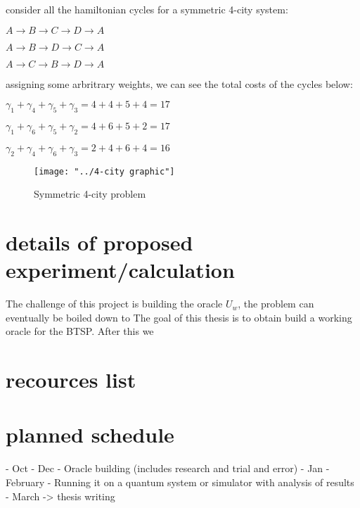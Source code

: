 \documentclass[twocolumn,showpacs,preprintnumbers,amsmath,amssymb]{revtex4}
\begin{document}
		consider all the hamiltonian cycles for a symmetric 4-city system:
		
		
		$ A \rightarrow B \rightarrow C \rightarrow D \rightarrow A $
		
		$ A \rightarrow B \rightarrow D \rightarrow C \rightarrow A $ 
		
		$ A \rightarrow C \rightarrow B \rightarrow D \rightarrow A $
		
		assigning some arbritrary weights, we can see the total costs of the cycles below:
		
		$\gamma_1 + \gamma_4 + \gamma_5 + \gamma_3 = 4 + 4 + 5 + 4 = 17$
		
		$ \gamma_1 + \gamma_6 + \gamma_5 + \gamma_2 = 4 + 6 + 5 + 2 = 17$
		
		$  \gamma_2 + \gamma_4 + \gamma_6 + \gamma_3 = 2 + 4 + 6 + 4 = 16$
		
		
		
	
		
		\begin{figure}[!h]
			\centering
			\texttt{[image: "../4-city graphic"]}
			\caption{Symmetric 4-city problem}
			\label{fig:4-city-graphic}
		\end{figure}		
		
		
		
		
		
		\section{details of proposed experiment/calculation}
		
		The challenge of this project is building the oracle $U_w$, the problem can eventually be boiled down to The goal of this thesis is to obtain build a working oracle for the BTSP. After this we  
		
		\section{recources list}
		
		
		
		\section{planned schedule}
		
		- Oct - Dec -  Oracle building (includes research and trial and error)
		- Jan - February -  Running it on a quantum system or simulator with analysis of results 
		- March -> thesis writing
		
		
		
	
\end{document}

